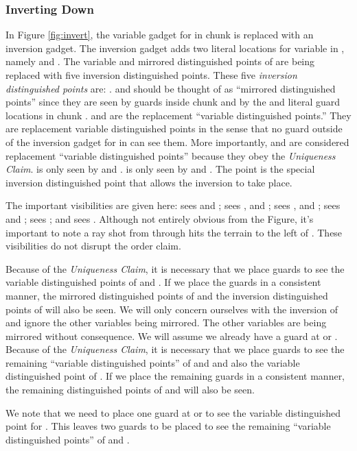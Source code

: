 \documentclass[11pt]{article}
\begin{document}
\subsubsection{Inverting Down}

In Figure \ref{fig:invert}, the variable gadget for  in chunk  is replaced with an inversion gadget.  The inversion gadget adds two literal locations for variable  in , namely  and .  The variable and mirrored distinguished points of  are being replaced with five inversion distinguished points.  These five \textit{inversion distinguished points} are: .   and  should be thought of as ``mirrored distinguished points'' since they are seen by guards inside chunk  and by the  and  literal guard locations in chunk .   and  are the replacement ``variable distinguished points.''  They are replacement variable distinguished points in the sense that no guard outside of the inversion gadget for  in  can see them.  More importantly,  and  are considered replacement ``variable distinguished points'' because they obey the {\em Uniqueness Claim}.   is only seen by  and .   is only seen by  and .  The  point is the special inversion distinguished point that allows the inversion to take place.  

The important visibilities are given here:  sees  and ;  sees ,  and ;   sees ,  and ;  sees  and ;  sees ; and  sees .  Although not entirely obvious from the Figure, it's important to note a ray shot from  through  hits the terrain to the left of .  These visibilities do not disrupt the order claim.

Because of the {\em Uniqueness Claim}, it is necessary that we place  guards to see the variable distinguished points of  and .  If we place the  guards in a consistent manner, the mirrored distinguished points of  and the inversion distinguished points of  will also be seen.  We will only concern ourselves with the inversion of  and ignore the other variables being mirrored.  The other variables are being mirrored without consequence.  We will assume we already have a guard at  or .  Because of the {\em Uniqueness Claim}, it is necessary that we place  guards to see the remaining ``variable distinguished points'' of  and  and also the variable distinguished point of .  If we place the remaining  guards in a consistent manner, the remaining distinguished points of  and  will also be seen.  

We note that we need to place one guard at  or  to see the variable distinguished point for .  This leaves two guards to be placed to see the remaining ``variable distinguished points'' of  and .
\end{document}
